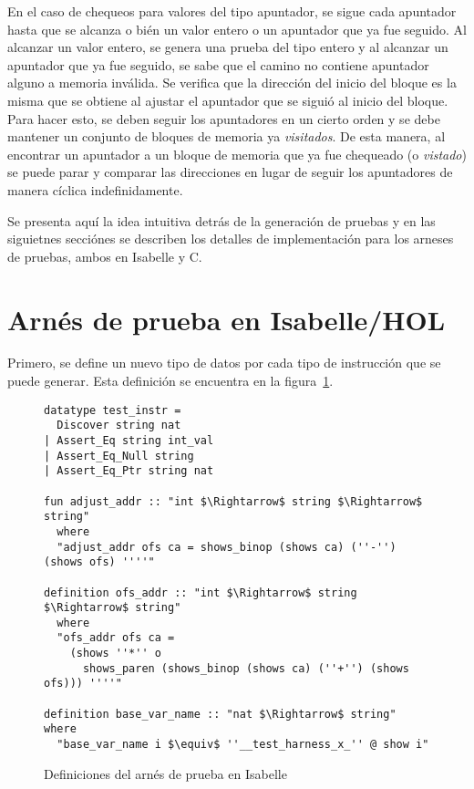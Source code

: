 En el caso de chequeos para valores del tipo apuntador, se sigue cada apuntador hasta que se alcanza o bién un valor entero o un apuntador que ya fue seguido.
Al alcanzar un valor entero, se genera una prueba del tipo entero y al alcanzar un apuntador que ya fue seguido, se sabe que el camino no contiene apuntador alguno a memoria inválida.
Se verifica que la dirección del inicio del bloque es la misma que se obtiene al ajustar el apuntador que se siguió al inicio del bloque.
Para hacer esto, se deben seguir los apuntadores en un cierto orden y se debe mantener un conjunto de bloques de memoria ya \textit{visitados}.
De esta manera, al encontrar un apuntador a un bloque de memoria que ya fue chequeado (o \textit{vistado}) se puede parar y comparar las direcciones en lugar de seguir los apuntadores de manera cíclica indefinidamente.

Se presenta aquí la idea intuitiva detrás de la generación de pruebas y en las siguietnes secciónes se describen los detalles de implementación para los arneses de pruebas, ambos en Isabelle y C.

\section{Arnés de prueba en Isabelle/HOL}

Primero, se define un nuevo tipo de datos por cada tipo de instrucción que se puede generar.
Esta definición se encuentra en la figura~\ref{fig:test_harness_datatype}.


\begin{figure}
\begin{lstlisting}[mathescape=true]
datatype test_instr =
  Discover string nat
| Assert_Eq string int_val
| Assert_Eq_Null string
| Assert_Eq_Ptr string nat

fun adjust_addr :: "int $\Rightarrow$ string $\Rightarrow$ string"
  where
  "adjust_addr ofs ca = shows_binop (shows ca) (''-'') (shows ofs) ''''"

definition ofs_addr :: "int $\Rightarrow$ string $\Rightarrow$ string"
  where
  "ofs_addr ofs ca =
    (shows ''*'' o
      shows_paren (shows_binop (shows ca) (''+'') (shows ofs))) ''''"

definition base_var_name :: "nat $\Rightarrow$ string" where
  "base_var_name i $\equiv$ ''__test_harness_x_'' @ show i"
\end{lstlisting}

\caption{Definiciones del arnés de prueba en Isabelle}
\label{fig:test_harness_datatype}
\end{figure}


